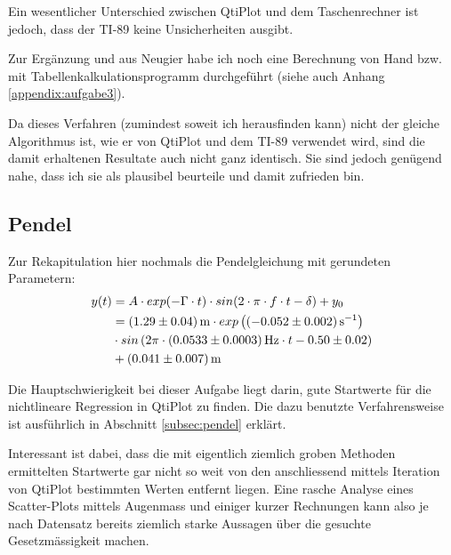 Ein  wesentlicher  Unterschied zwischen  QtiPlot  und  dem Taschenrechner  ist
jedoch, dass der TI-89 keine Unsicherheiten ausgibt.

Zur  Erg\"anzung und  aus  Neugier  habe ich  noch  eine  Berechnung von  Hand
bzw.  mit  Tabellenkalkulationsprogramm   durchgef\"uhrt  (siehe  auch  Anhang
\ref{appendix:aufgabe3}).

Da dieses Verfahren (zumindest soweit ich herausfinden kann) nicht der gleiche
Algorithmus  ist, wie  er  von  QtiPlot und  dem  TI-89  verwendet wird,  sind
die  damit erhaltenen  Resultate auch  nicht ganz  identisch. Sie sind  jedoch
gen\"ugend nahe, dass ich sie als plausibel beurteile und damit zufrieden bin.


\subsection{Pendel}

Zur Rekapitulation hier nochmals die Pendelgleichung mit gerundeten Parametern:
\begin{align*}
    y(t)   & = A \cdot exp(-\Gamma \cdot t) \cdot sin(2 \cdot \pi \cdot f \cdot t - \delta) + y_0 \\
           & =     \SI[separate-uncertainty = true]{1.29 \pm 0.04}{\meter}
           \cdot exp\left(\SI[separate-uncertainty = true]{-0.052 \pm 0.002}{\per\second}\right) \\
           & \cdot sin\left(2\pi \cdot \SI[separate-uncertainty = true]{0.0533 \pm 0.0003}{\hertz} \cdot t - \num[separate-uncertainty = true]{0.50 \pm 0.02}\right) \\
           & + \SI[separate-uncertainty = true]{0.041 \pm 0.007}{\meter}
\end{align*}

Die  Hauptschwierigkeit  bei  dieser  Aufgabe  liegt  darin,  gute  Startwerte
f\"ur  die nichtlineare  Regression in  QtiPlot zu  finden. Die dazu  benutzte
Verfahrensweise ist ausf\"uhrlich in Abschnitt \ref{subsec:pendel} erkl\"art.

Interessant  ist  dabei, dass  die  mit  eigentlich ziemlich  groben  Methoden
ermittelten  Startwerte  gar  nicht  so weit  von  den  anschliessend  mittels
Iteration von  QtiPlot bestimmten Werten entfernt  liegen. Eine rasche Analyse
eines Scatter-Plots mittels Augenmass und  einiger kurzer Rechnungen kann also
je  nach  Datensatz  bereits  ziemlich starke  Aussagen  \"uber  die  gesuchte
Gesetzm\"assigkeit machen.

